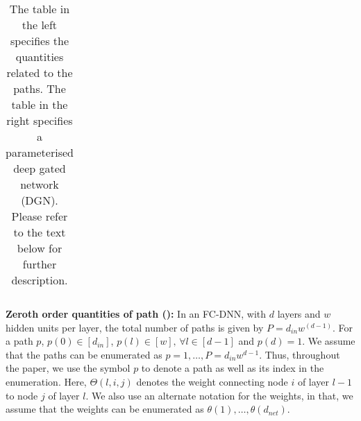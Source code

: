 \begin{table}[!htb]
\begin{minipage}{0.5\columnwidth}
{\begin{tabular}{|c|c|}
\end{tabular}
}
\end{minipage}
\caption{The table in the left specifies the quantities related to the paths. The table in the right specifies a parameterised deep gated network (DGN).  Please refer to the text below for further description.}
\label{tb:dgn-path}
\end{table}
\textbf{Zeroth order quantities of path ():} In an FC-DNN, with $d$ layers and $w$ hidden units per layer, the total number of paths is given by $P=d_{in}w^{(d-1)}$. For a path $p$, $p(0)\in [d_{in}]$, $p(l)\in[w],\,\forall l\in[d-1]$ and $p(d)=1$. We assume that the paths can be enumerated as $p=1,\ldots, P = d_{in}w^{d-1}$. Thus, throughout the paper, we use the symbol $p$ to denote a path as well as its index in the enumeration. Here, $\Theta(l,i,j)$ denotes the weight connecting node $i$ of layer $l-1$ to node $j$ of layer $l$. We also use an alternate notation for the weights, in that, we assume that the weights can be enumerated as $\theta(1),\ldots,\theta(d_{net})$. 

